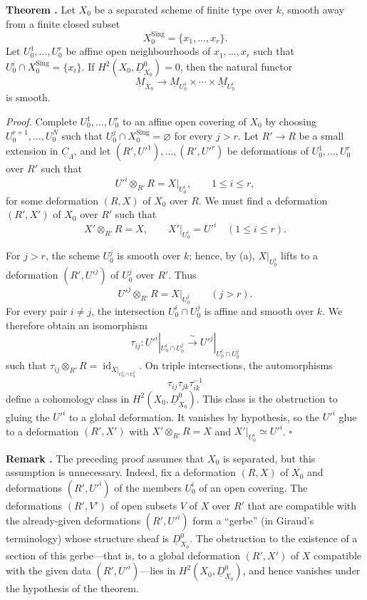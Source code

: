 
\medskip
\noindent\textbf{Theorem .}
Let $X_0$ be a separated scheme of finite type over $k$, smooth away
from a finite closed subset
\[
X_0^{\mathrm{Sing}}=\{x_1,\ldots,x_r\}.
\]
Let $U_0^1,\ldots,U_0^r$ be affine open neighbourhoods of
$x_1,\ldots,x_r$ such that
$U_0^i\cap X_0^{\mathrm{Sing}}=\{x_i\}$. If
$H^2(X_0,\underline D^0_{X_0})=0$, then the natural functor
\[
\underline M_{X_0}\longrightarrow
\underline M_{U_0^1}\times\cdots\times\underline M_{U_0^r}
\]
is smooth.

\smallskip
\noindent\textit{Proof.}
Complete $U_0^1,\ldots,U_0^r$ to an affine open covering of $X_0$
by choosing $U_0^{r+1},\ldots,U_0^N$ such that
$U_0^j\cap X_0^{\mathrm{Sing}}=\varnothing$ for every $j>r$.
Let $R'\longrightarrow R$ be a small extension in
$\underline C_\Lambda$, and let
$(R',U'^1),\ldots,(R',U'^r)$ be deformations of
$U_0^1,\ldots,U_0^r$ over $R'$ such that
\[
U'^i\otimes_{R'}R=X|_{U_0^i},\qquad 1\leq i\leq r,
\]
for some deformation $(R,X)$ of $X_0$ over $R$. We must find a
deformation $(R',X')$ of $X_0$ over $R'$ such that
\[
X'\otimes_{R'}R=X,
\qquad
X'|_{U_0^i}=U'^i\quad(1\leq i\leq r).
\]


For $j>r$, the scheme $U_0^j$ is smooth over $k$; hence, by (a),
$X|_{U_0^j}$ lifts to a deformation $(R',U'^j)$ of $U_0^j$ over
$R'$. Thus
\[
U'^j\otimes_{R'}R=X|_{U_0^j}\qquad(j>r).
\]
For every pair $i\neq j$, the intersection $U_0^i\cap U_0^j$ is
affine and smooth over $k$. We therefore obtain an isomorphism
\[
\tau_{ij}:U'^i|_{U_0^i\cap U_0^j}
\xrightarrow{\ \sim\ }
U'^j|_{U_0^i\cap U_0^j}
\]
such that
$\tau_{ij}\otimes_{R'}R=\operatorname{id}_{X|_{U_0^i\cap U_0^j}}$.
On triple intersections, the automorphisms
\[
\tau_{ij}\tau_{jk}\tau_{ik}^{-1}
\]
define a cohomology class in
$H^2(X_0,\underline D^0_{X_0})$. This class is the obstruction to
gluing the $U'^i$ to a global deformation. It vanishes by hypothesis,
so the $U'^i$ glue to a deformation $(R',X')$ with
$X'\otimes_{R'}R=X$ and $X'|_{U_0^i}\simeq U'^i$. \hfill$\square$

\medskip
\noindent\textbf{Remark .}
The preceding proof assumes that $X_0$ is separated, but this
assumption is unnecessary. Indeed, fix a deformation $(R,X)$ of
$X_0$ and deformations $(R',U'^i)$ of the members $U_0^i$ of an open
covering. The deformations $(R',V')$ of open subsets $V$ of $X$ over
$R'$ that are compatible with the already-given deformations
$(R',U'^i)$ form a ``gerbe'' (in Giraud's terminology) whose
structure sheaf is $\underline D^0_{X_0}$. The obstruction to the
existence of a section of this gerbe---that is, to a global
deformation $(R',X')$ of $X$ compatible with the given data
$(R',U'^i)$---lies in $H^2(X_0,\underline D^0_{X_0})$, and hence
vanishes under the hypothesis of the theorem.

